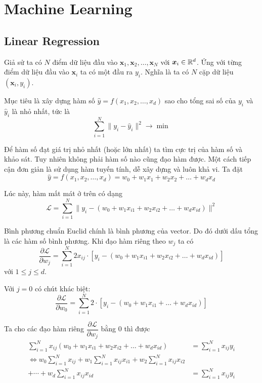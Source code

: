 \chapter{Machine Learning}

\section*{Linear Regression}

Giả sử ta có $N$ điểm dữ liệu đầu vào $\bm{x}_1, \bm{x}_2, \ldots, \bm{x}_N$ với $\bm{x}_i \in \mathbb{R}^d$. Ứng với từng điểm dữ liệu đầu vào $\bm{x}_i$ ta có một đầu ra $y_i$. Nghĩa là ta có $N$ cặp dữ liệu $(\bm{x}_i, y_i)$.

Mục tiêu là xây dựng hàm số $\hat{y} = f(x_1, x_2, \ldots, x_d)$ sao cho tổng sai số của $y_i$ và $\hat{y}_i$ là nhỏ nhất, tức là \[ \sum_{i=1}^N \lVert y_i - \hat{y}_i \rVert^2 \to \min \]

Để hàm số đạt giá trị nhỏ nhất (hoặc lớn nhất) ta tìm cực trị của hàm số và khảo sát. Tuy nhiên không phải hàm số nào cũng đạo hàm được. Một cách tiếp cận đơn giản là sử dụng hàm tuyến tính, dễ xây dựng và luôn khả vi. Ta đặt \[ \hat{y} = f(x_1, x_2, \ldots, x_d) = w_0 + w_1 x_1 + w_2 x_2 + \ldots + w_d x_d \]

Lúc này, hàm mất mát ở trên có dạng
\begin{equation*}
    \mathcal{L} = \sum_{i=1}^N \lVert y_i - (w_0 + w_1 x_{i1} + w_2 x_{i2} + \ldots + w_d x_{id}) \rVert^2
\end{equation*}

Bình phương chuẩn Euclid chính là bình phương của vector. Do đó dưới dấu tổng là các hàm số bình phương. Khi đạo hàm riêng theo $w_j$ ta có
\begin{equation*}
    \dfrac{\partial \mathcal{L}}{\partial w_j} = \sum_{i=1}^N 2 x_{ij} \cdot \left[ y_i - (w_0 + w_1 x_{i1} + w_2 x_{i2} + \ldots + w_d x_{id}) \right]
\end{equation*}
với $1 \leqslant j \leqslant d$. 

Với $j = 0$ có chút khác biệt:
\begin{equation*}
    \dfrac{\partial \mathcal{L}}{\partial w_0} = \sum_{i=1}^N 2 \cdot \left[ y_i - (w_0 + w_1 x_{i1} + \ldots + w_d x_{id}) \right]
\end{equation*}

Ta cho các đạo hàm riêng $\dfrac{\partial \mathcal{L}}{\partial w_j}$ bằng 0 thì được
\begin{align*}
    \sum_{i=1}^N x_{ij} (w_0 + w_1 x_{i1} + w_2 x_{i2} + \ldots + w_d x_{id}) & = \sum_{i=1}^N x_{ij} y_i \\ \Leftrightarrow w_0 \sum_{i=1}^N x_{ij} + w_1 \sum_{i=1}^N x_{ij} x_{i1} + w_2 \sum_{i=1}^N x_{ij} x_{i2} \\ + \cdots + w_d \sum_{i=1}^N x_{ij} x_{id} & = \sum_{i=1}^N x_{ij} y_i
\end{align*}

